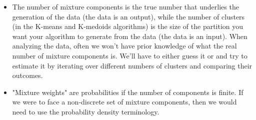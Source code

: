 \documentclass[a4paper, 12pt]{article}
\begin{document}
\begin{itemize}
\item The number of mixture components is the true number that underlies the
generation of the data (the data is an output), while the number of clusters
(in the K-means and K-medoids algorithms) is the size of the partition you
want your algorithm to generate from the data (the data is an input). When
analyzing the data, often we won't have prior knowledge of what the real
number of mixture components is. We'll have to either guess it or and try to
estimate it by iterating over different numbers of clusters and comparing
their outcomes.
\item "Mixture weights" are probabilities if the number of components is finite. If
we were to face a non-discrete set of mixture components, then we would need
to use the probability density terminology.
\end{itemize}
\end{document}
